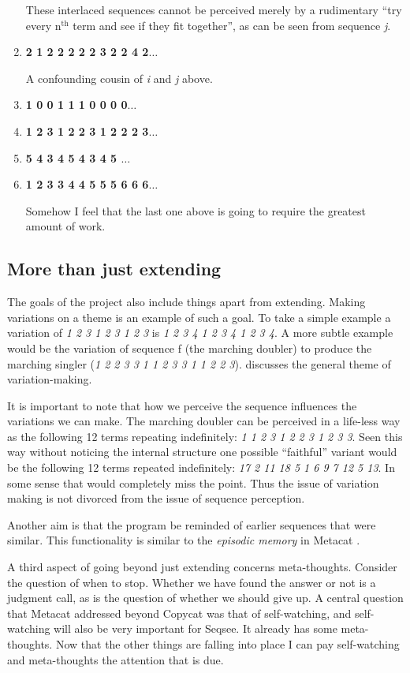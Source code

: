 \documentclass[letterpaper]{article}
\begin{document}
\begin{enumerate}
These interlaced sequences cannot be perceived merely by a rudimentary ``try every n$^\mathrm{th}$ term and see if they fit together'', as can be seen from sequence \emph{j}.

\item \textbf{ 2 1 2 2 2 2 2 3 2 2 4 2$\ldots$}

A confounding cousin of \emph{i} and \emph{j} above.

\item \textbf{ 1 0 0 1 1 1 0 0 0 0$\ldots$}
\item \textbf{ 1 2 3 1 2 2 3 1 2 2 2 3$\ldots$}
\item \textbf{ 5 4 3 4 5 4 3 4 5 $\ldots$}
\item \textbf{ 1 2 3 3 4 4 5 5 5 6 6 6$\ldots$}

Somehow I feel that the last one above is going to require the greatest amount of work.
\end{enumerate}

\subsection{More than just extending}
\label{sec:more}
The goals of the project also include things apart from extending.  Making variations on a theme is an example of such a goal.  To take a simple example a variation of \emph{1 2 3 1 2 3 1 2 3} is \emph{1 2 3 4 1 2 3 4 1 2 3 4}.  A more subtle example would be the variation of  sequence f (the marching doubler) to produce the marching singler (\emph{1 2 2 3 3 1 1 2 3 3 1 1 2 2 3}).  discusses the general theme of variation-making.

It is important to note that how we perceive the sequence influences the variations we can make.  The marching doubler can be perceived in a life-less way as the following 12 terms repeating indefinitely: \emph{1 1 2 3 1 2 2 3 1 2 3 3}.  Seen this way without noticing the internal structure one possible ``faithful'' variant would be the following 12 terms repeated indefinitely: \emph{17 2 11 18 5 1 6 9 7 12 5 13}. In some sense that would completely miss the point. Thus the issue of variation making is not divorced from the issue of sequence perception.

Another aim is that the program be reminded of earlier sequences that were similar.  This functionality is similar to the \emph{episodic memory} in Metacat \cite{Marshall}.

A third aspect of going beyond just extending concerns meta-thoughts.  Consider the question of when to stop.  Whether we have found the answer or not is a judgment call, as is the question of whether we should give up. A central question that Metacat addressed beyond Copycat was that of self-watching, and self-watching will also be very important for Seqsee. It already has some meta-thoughts. Now that the other things are falling into place I can pay self-watching and meta-thoughts the attention that is due. 
\end{document}
